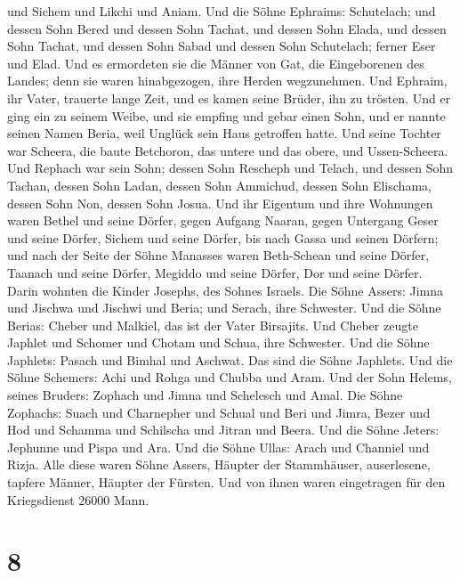und Sichem und Likchi und Aniam.  Und die Söhne Ephraims:
Schutelach; und dessen Sohn Bered und dessen Sohn Tachat, und dessen
Sohn Elada,  und dessen Sohn Tachat, und dessen Sohn
Sabad und dessen Sohn Schutelach; ferner Eser und Elad. Und es
ermordeten sie die Männer von Gat, die Eingeborenen des Landes; denn sie
waren hinabgezogen, ihre Herden wegzunehmen.  Und
Ephraim, ihr Vater, trauerte lange Zeit, und es kamen seine Brüder, ihn
zu trösten.  Und er ging ein zu seinem Weibe, und sie
empfing und gebar einen Sohn, und er nannte seinen Namen Beria, weil
Unglück sein Haus getroffen hatte.  Und seine Tochter war
Scheera, die baute Betchoron, das untere und das obere, und
Ussen-Scheera.  Und Rephach war sein Sohn; dessen Sohn
Rescheph und Telach, und dessen Sohn Tachan,  dessen Sohn
Ladan, dessen Sohn Ammichud, dessen Sohn Elischama, 
dessen Sohn Non, dessen Sohn Josua.  Und ihr Eigentum und
ihre Wohnungen waren Bethel und seine Dörfer, gegen Aufgang Naaran,
gegen Untergang Geser und seine Dörfer, Sichem und seine Dörfer, bis
nach Gassa und seinen Dörfern;  und nach der Seite der
Söhne Manasses waren Beth-Schean und seine Dörfer, Taanach und seine
Dörfer, Megiddo und seine Dörfer, Dor und seine Dörfer. Darin wohnten
die Kinder Josephs, des Sohnes Israels.  Die Söhne
Assers: Jimna und Jischwa und Jischwi und Beria; und Serach, ihre
Schwester.  Und die Söhne Berias: Cheber und Malkiel, das
ist der Vater Birsajits.  Und Cheber zeugte Japhlet und
Schomer und Chotam und Schua, ihre Schwester.  Und die
Söhne Japhlets: Pasach und Bimhal und Aschwat. Das sind die Söhne
Japhlets.  Und die Söhne Schemers: Achi und Rohga und
Chubba und Aram.  Und der Sohn Helems, seines Bruders:
Zophach und Jimna und Schelesch und Amal.  Die Söhne
Zophachs: Suach und Charnepher und Schual und Beri und Jimra,
 Bezer und Hod und Schamma und Schilscha und Jitran und
Beera.  Und die Söhne Jeters: Jephunne und Pispa und Ara.
 Und die Söhne Ullas: Arach und Channiel und Rizja.
 Alle diese waren Söhne Assers, Häupter der Stammhäuser,
auserlesene, tapfere Männer, Häupter der Fürsten. Und von ihnen waren
eingetragen für den Kriegsdienst 26000 Mann.

\hypertarget{section-7}{%
\section{8}\label{section-7}}

